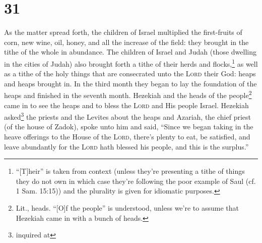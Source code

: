 \section{31}\label{2 Chronicles 31}
\begin{enumerate}[align=center]
     As the matter spread forth, the children of Israel multiplied the first-fruits of corn, new wine, oil, honey, and all the increase of the field: they brought in the tithe of the whole in abundance.%
     The children of Israel and Judah (those dwelling in the cities of Judah) also brought forth a tithe of their herds and flocks,\footnote{``[T]heir'' is taken from context (unless they're presenting a tithe of things they do not own in which case they're following the poor example of Saul (cf. 1 Sam. 15:15)) and the plurality is given for idiomatic purposes.} as well as a tithe of the holy things that are consecrated unto the \textsc{Lord} their God: heaps and heaps brought in.%
     In the third month they began to lay the foundation of the heaps and finished in the seventh month.%
     Hezekiah and the heads of the people\footnote{Lit., heads. ``[O]f the people'' is understood, unless we're to assume that Hezekiah came in with a bunch of heads.} came in to see the heaps and to bless the \textsc{Lord} and His people Israel.%
     Hezekiah asked\footnote{inquired at} the priests and the Levites about the heaps%
     and Azariah, the chief priest (of the house of Zadok), spoke unto him and said, ``Since we began taking in the heave offerings to the House of the \textsc{Lord}, there's plenty to eat, be satisfied, and leave abundantly for the \textsc{Lord} hath blessed his people, and this is the surplus.''%
\end{enumerate}
